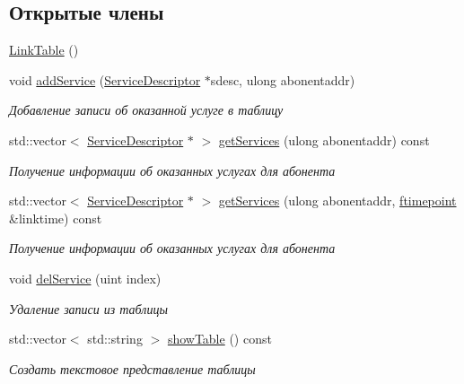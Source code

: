 \subsection*{Открытые члены}
\begin{DoxyCompactItemize}
\item 
\hyperlink{class_network_service_1_1_link_table_aa2f1589a76041fd55a7c4926635389a0}{Link\+Table} ()
\item 
void \hyperlink{class_network_service_1_1_link_table_a31612d870964984c4d6c83208a28684d}{add\+Service} (\hyperlink{class_network_service_1_1_service_descriptor}{Service\+Descriptor} $\ast$sdesc, ulong abonentaddr)
\begin{DoxyCompactList}\small\item\em Добавление записи об оказанной услуге в таблицу \end{DoxyCompactList}\item 
std\+::vector$<$ \hyperlink{class_network_service_1_1_service_descriptor}{Service\+Descriptor} $\ast$ $>$ \hyperlink{class_network_service_1_1_link_table_ac1d3769516f51abd5eb7766d009a54fb}{get\+Services} (ulong abonentaddr) const 
\begin{DoxyCompactList}\small\item\em Получение информации об оказанных услугах для абонента \end{DoxyCompactList}\item 
std\+::vector$<$ \hyperlink{class_network_service_1_1_service_descriptor}{Service\+Descriptor} $\ast$ $>$ \hyperlink{class_network_service_1_1_link_table_a44427b02da77b0478b71ac73ea3e0ef5}{get\+Services} (ulong abonentaddr, \hyperlink{networkservice_8h_ac877dfabb0f4f6a8184aa821b447e81d}{ftimepoint} \&linktime) const 
\begin{DoxyCompactList}\small\item\em Получение информации об оказанных услугах для абонента \end{DoxyCompactList}\item 
void \hyperlink{class_network_service_1_1_link_table_a4aef03eef2e1ed5d60f99075eff7aa96}{del\+Service} (uint index)
\begin{DoxyCompactList}\small\item\em Удаление записи из таблицы \end{DoxyCompactList}\item 
std\+::vector$<$ std\+::string $>$ \hyperlink{class_network_service_1_1_link_table_a5381c7f8fd23c726dd1c89e429f9e8e2}{show\+Table} () const 
\begin{DoxyCompactList}\small\item\em Создать текстовое представление таблицы \end{DoxyCompactList}\item 

\end{DoxyCompactItemize}
